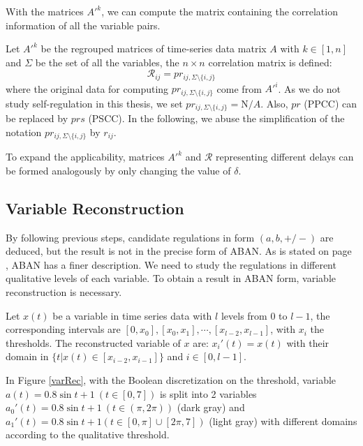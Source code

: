 With the matrices $A'^k$, we can compute the matrix containing the correlation information of all the variable pairs.

\begin{definition}\label{def:corrMatrix}
    Let $A'^k$ be the regrouped matrices of time-series data matrix $A$ with $k\in [1,n]$ and $\Sigma$ be the set of all the variables, the $n\times n$ correlation matrix is defined:
    $$\mathcal{R}_{ij}=pr_{ij,\Sigma\setminus\{i,j\}}$$ 
    where the original data for computing $pr_{ij,\Sigma\setminus\{i,j\}}$ come from $A'^i$.
    As we do not study self-regulation in this thesis, we set $pr_{ij,\Sigma\setminus\{i,j\}}=\mathrm N/A$.
    Also, $pr$ (PPCC) can be replaced by $prs$ (PSCC).
    In the following, we abuse the simplification of the notation $pr_{ij,\Sigma\setminus\{i,j\}}$ by $r_{ij}$.
\end{definition}

To expand the applicability, matrices $A'^k$ and $\mathcal{R}$ representing different delays can be formed analogously by only changing the value of $\delta$.

\subsection{Variable Reconstruction}
By following previous steps, candidate regulations in form $(a,b,+/-)$ are deduced, but the result is not in the precise form of ABAN. 
As is stated on page \pageref{par:advantage}, ABAN has a finer description.
We need to study the regulations in different qualitative levels of each variable.
To obtain a result in ABAN form, variable reconstruction is necessary.

\begin{definition}
    Let $x(t)$ be a variable in time series data with $l$ levels from $0$ to $l-1$, the corresponding intervals are $[0,x_0],[x_0,x_1],\cdots,[x_{l-2},x_{l-1}]$, with $x_i$ the thresholds. 
    The reconstructed variable of $x$ are:
        $x_i'(t)=x(t)$ with their domain in $\{t|x(t)\in [x_{i-2},x_{i-1}]\}$ and $i\in [0,l-1]$.
\end{definition}

\begin{example}
In Figure \ref{varRec}, with the Boolean discretization on the threshold, variable $a(t)=0.8\sin t+1\ (t\in [0,7])$ is split into 2 variables $a_0'(t)=0.8\sin t+1\ (t\in (\pi,2\pi))$ (dark gray) and $a_1'(t)=0.8\sin t+1(t\in [0,\pi]\cup[2\pi,7])$ (light gray) with different domains according to the qualitative threshold.
\end{example}

